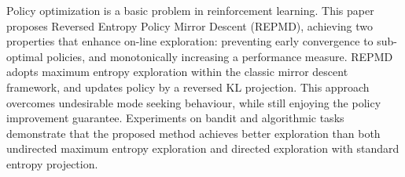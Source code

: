 
Policy optimization is a basic problem in reinforcement learning. This paper proposes Reversed Entropy Policy Mirror Descent (REPMD), achieving two properties that enhance on-line exploration: preventing early convergence to  sub-optimal policies, and monotonically increasing a performance measure. REPMD adopts maximum entropy exploration within the classic mirror descent framework, and updates policy by a reversed KL projection. This approach overcomes undesirable mode seeking behaviour, while still enjoying the policy improvement guarantee. Experiments on bandit and algorithmic tasks demonstrate that the proposed method achieves better exploration than both undirected maximum entropy exploration and directed exploration with standard entropy projection.

